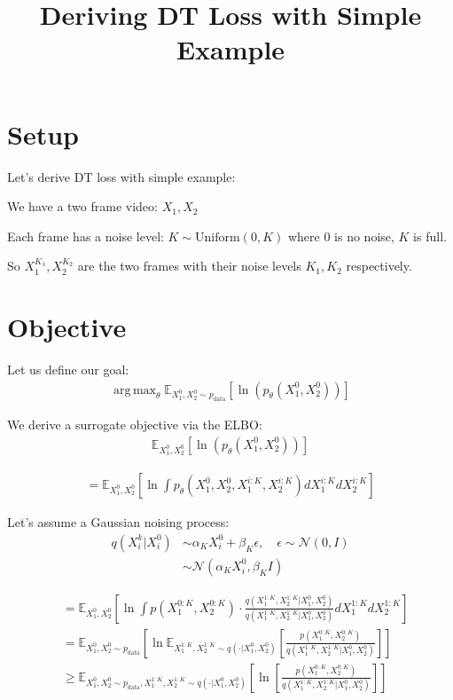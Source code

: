 \documentclass[11pt]{article}
\title{Deriving DT Loss with Simple Example}
\author{}
\date{}
\DeclareMathOperator*{\argmax}{arg\,max}
\begin{document}
\maketitle

\section{Setup}
Let's derive DT loss with simple example:

We have a two frame video: $X_1, X_2$

Each frame has a noise level:
$K \sim \text{Uniform}(0, K)$ where 0 is no noise, $K$ is full.

So $X_1^{K_1}, X_2^{K_2}$ are the two frames with their noise levels $K_1, K_2$ respectively.

\section{Objective}
Let us define our goal:
\begin{align}
\argmax_\theta \mathbb{E}_{X_1^0, X_2^0 \sim p_{\text{data}}} \left[ \ln(p_\theta(X_1^0, X_2^0)) \right]
\end{align}

We derive a surrogate objective via the ELBO:
\begin{align}
\mathbb{E}_{X_1^0, X_2^0} \left[ \ln(p_\theta(X_1^0, X_2^0)) \right]
\end{align}

\begin{align}
= \mathbb{E}_{X_1^0, X_2^0} \left[ \ln \int p_\theta(X_1^0, X_2^0, X_1^{i:K}, X_2^{i:K}) dX_1^{i:K} dX_2^{i:K} \right]
\end{align}

Let's assume a Gaussian noising process:
\begin{align}
q(X_i^k | X_i^0) &\sim \alpha_K X_i^0 + \beta_K \epsilon, \quad \epsilon \sim \mathcal{N}(0, I) \\
&\sim \mathcal{N}(\alpha_K X_i^0, \beta_K I)
\end{align}

\begin{align}
&= \mathbb{E}_{X_1^0, X_2^0} \left[ \ln \int p(X_1^{0:K}, X_2^{0:K}) \cdot \frac{q(X_1^{1:K}, X_2^{1:K} | X_1^0, X_2^0)}{q(X_1^{1:K}, X_2^{1:K} | X_1^0, X_2^0)} dX_1^{1:K} dX_2^{1:K} \right] \\
&= \mathbb{E}_{X_1^0, X_2^0 \sim p_{\text{data}}} \left[ \ln \mathbb{E}_{X_1^{1:K}, X_2^{1:K} \sim q(\cdot | X_1^0, X_2^0)} \left[ \frac{p(X_1^{0:K}, X_2^{0:K})}{q(X_1^{1:K}, X_2^{1:K} | X_1^0, X_2^0)} \right] \right] \\
&\geq \mathbb{E}_{X_1^0, X_2^0 \sim p_{\text{data}}, X_1^{1:K}, X_2^{1:K} \sim q(\cdot | X_1^0, X_2^0)} \left[ \ln \left[ \frac{p(X_1^{0:K}, X_2^{0:K})}{q(X_1^{1:K}, X_2^{1:K} | X_1^0, X_2^0)} \right] \right]
\end{align}
\end{document}
